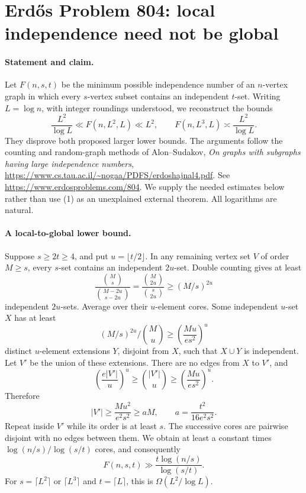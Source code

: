 \section*{Erd\H{o}s Problem 804: local independence need not be global}

\paragraph{Statement and claim.}
Let \(F(n,s,t)\) be the minimum possible independence number
of an \(n\)-vertex graph in which every \(s\)-vertex subset
contains an independent \(t\)-set.
Writing \(L=\log n\), with integer roundings understood,
we reconstruct the bounds
\[
 \frac{L^2}{\log L}\ll F(n,L^2,L)\ll L^2,\qquad
 F(n,L^3,L)\asymp\frac{L^2}{\log L}.                            \tag{1}
\]
They disprove both proposed larger lower bounds.
The arguments follow the counting and random-graph methods
of Alon--Sudakov,
\emph{On graphs with subgraphs having large independence numbers},
\url{https://www.cs.tau.ac.il/~nogaa/PDFS/erdoshajnal4.pdf}.
See \url{https://www.erdosproblems.com/804}.
We supply the needed estimates below rather than use (1)
as an unexplained external theorem. All logarithms are natural.

\paragraph{A local-to-global lower bound.}
Suppose \(s\geq2t\geq4\), and put \(u=\lfloor t/2\rfloor\).
In any remaining vertex set \(V\) of order \(M\geq s\),
every \(s\)-set contains an independent \(2u\)-set.
Double counting gives at least
\[
 \frac{\binom Ms}{\binom{M-2u}{s-2u}}
 =\frac{\binom M{2u}}{\binom s{2u}}
 \geq(M/s)^{2u}
\]
independent \(2u\)-sets.
Average over their \(u\)-element cores. Some independent
\(u\)-set \(X\) has at least
\[
 (M/s)^{2u}/\binom Mu
 \geq\left(\frac{Mu}{es^2}\right)^u
\]
distinct \(u\)-element extensions \(Y\), disjoint from \(X\),
such that \(X\cup Y\) is independent.
Let \(V'\) be the union of these extensions.
There are no edges from \(X\) to \(V'\), and
\[
 \left(\frac{e|V'|}{u}\right)^u
 \geq\binom{|V'|}{u}
 \geq\left(\frac{Mu}{es^2}\right)^u.
\]
Therefore
\[
 |V'|\geq\frac{Mu^2}{e^2s^2}
       \geq aM,\qquad a=\frac{t^2}{16e^2s^2}.
\]
Repeat inside \(V'\) while its order is at least \(s\).
The successive cores are pairwise disjoint with no edges
between them. We obtain at least a constant times
\(\log(n/s)/\log(s/t)\) cores, and consequently
\[
 F(n,s,t)\gg\frac{t\log(n/s)}{\log(s/t)}.                       \tag{2}
\]
For \(s=\lceil L^2\rceil\) or \(\lceil L^3\rceil\) and
\(t=\lceil L\rceil\), this is \(\Omega(L^2/\log L)\).

